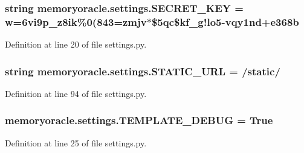 \subsubsection[{S\+E\+C\+R\+E\+T\+\_\+\+K\+E\+Y}]{\setlength{\rightskip}{0pt plus 5cm}string memoryoracle.\+settings.\+S\+E\+C\+R\+E\+T\+\_\+\+K\+E\+Y = \textquotesingle{}w=6vi9p\+\_\+z8ik\%0(843=zmjv$\ast$\$5qc\$kf\+\_\+g!lo5-\/vqy1nd+e368b\textquotesingle{}}\label{namespacememoryoracle_1_1settings_a8a181b7a3e7e47b16b6900941d5d6284}


Definition at line 20 of file settings.\+py.

\hypertarget{namespacememoryoracle_1_1settings_acb558760188386601f245688e233bcd8}{}
\subsubsection[{S\+T\+A\+T\+I\+C\+\_\+\+U\+R\+L}]{\setlength{\rightskip}{0pt plus 5cm}string memoryoracle.\+settings.\+S\+T\+A\+T\+I\+C\+\_\+\+U\+R\+L = \textquotesingle{}/static/\textquotesingle{}}\label{namespacememoryoracle_1_1settings_acb558760188386601f245688e233bcd8}


Definition at line 94 of file settings.\+py.

\hypertarget{namespacememoryoracle_1_1settings_adb6dc4ebf65e09f416038d725c2ddec4}{}
\subsubsection[{T\+E\+M\+P\+L\+A\+T\+E\+\_\+\+D\+E\+B\+U\+G}]{\setlength{\rightskip}{0pt plus 5cm}memoryoracle.\+settings.\+T\+E\+M\+P\+L\+A\+T\+E\+\_\+\+D\+E\+B\+U\+G = True}\label{namespacememoryoracle_1_1settings_adb6dc4ebf65e09f416038d725c2ddec4}


Definition at line 25 of file settings.\+py.

\hypertarget{namespacememoryoracle_1_1settings_a71b87e5d3e6de18ad0701a27d643558a}{}
